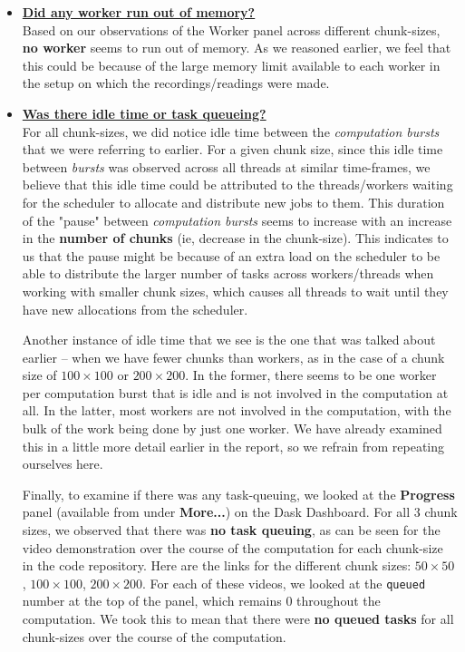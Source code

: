 \documentclass[a4paper,12pt]{article}
\begin{document}
\begin{itemize}
\item \textbf{\underline{Did any worker run out of memory?}}\\
Based on our observations of the Worker panel across different chunk-sizes, \textbf{no worker} seems to run out of memory. As we reasoned earlier, we feel that this could be because of the large memory limit available to each worker in the setup on which the recordings/readings were made.

\item \textbf{\underline{Was there idle time or task queueing?}}\\
For all chunk-sizes, we did notice idle time between the \textit{computation bursts} that we were referring to earlier. For a given chunk size, since this idle time between \textit{bursts} was observed across all threads at similar time-frames, we believe that this idle time could be attributed to the threads/workers waiting for the scheduler to allocate and distribute new jobs to them. This duration of the "pause" between \textit{computation bursts} seems to increase with an increase in the \textbf{number of chunks} (ie, decrease in the chunk-size). This indicates to us that the pause might be because of an extra load on the scheduler to be able to distribute the larger number of tasks across workers/threads when working with smaller chunk sizes, which causes all threads to wait until they have new allocations from the scheduler. 

Another instance of idle time that we see is the one that was talked about earlier -- when we have fewer chunks than workers, as in the case of a chunk size of $100 \times 100$ or $200 \times 200$. In the former, there seems to be one worker per computation burst that is idle and is not involved in the computation at all. In the latter, most workers are not involved in the computation, with the bulk of the work being done by just one worker. We have already examined this in a little more detail earlier in the report, so we refrain from repeating ourselves here. 

Finally, to examine if there was any task-queuing, we looked at the \textbf{Progress} panel (available from under \textbf{More...}) on the Dask Dashboard. For all 3 chunk sizes, we observed that there was \textbf{no task queuing}, as can be seen for the video demonstration over the course of the computation for each chunk-size in the code repository. Here are the links for the different chunk sizes: \href{https://github.com/paulmyr/DD2358-HPC25/tree/master/04_parallel/bonus#chunk-size-50-1}{$50 \times 50$}, \href{https://github.com/paulmyr/DD2358-HPC25/tree/master/04_parallel/bonus#chunk-size-100-1}{$100 \times 100$}, \href{https://github.com/paulmyr/DD2358-HPC25/tree/master/04_parallel/bonus#chunk-size-200-1}{$200 \times 200$}. For each of these videos, we looked at the \verb|queued| number at the top of the panel, which remains 0 throughout the computation. We took this to mean that there were \textbf{no queued tasks} for all chunk-sizes over the course of the computation.


\end{itemize}
\end{document}
